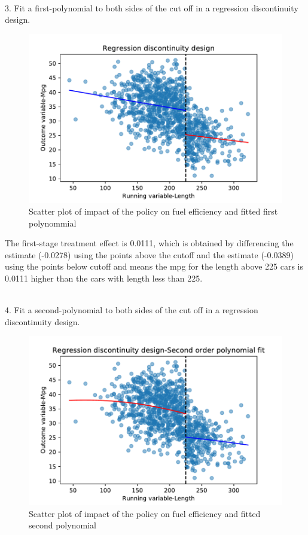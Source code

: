 \documentclass{article}
\begin{document}
~\\
3. Fit a first-polynomial to both sides of the cut off in a regression discontinuity design. 
\begin{figure}[H]
\centering
 \includegraphics[scale = 0.9]{q3.pdf}
 \caption{Scatter plot of impact of the policy on fuel efficiency and fitted first polynommial}
 
 \end{figure}
The first-stage treatment effect is 0.0111, which is obtained by differencing the estimate (-0.0278) using the points above the cutoff and the estimate (-0.0389) using the points below cutoff and means the mpg for the length above 225 cars is 0.0111 higher than the cars with length less than 225.

~\\
4. Fit a second-polynomial to both sides of the cut off in a regression discontinuity design. 

\begin{figure}[H]
\centering
 \includegraphics[scale = 0.9]{q4.pdf}
 \caption{Scatter plot of impact of the policy on fuel efficiency and fitted second polynomial}
 
 \end{figure}
 
\end{document}
